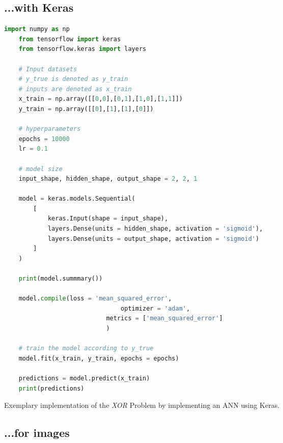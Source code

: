 %
\clearpage


%
%
\subsection{...with Keras}	
%
%

%
%
\vspace{0.5cm}
\begin{algorithm}
	\begin{lstlisting}[language=Python]
	import numpy as np
	from tensorflow import keras
	from tensorflow.keras import layers

	# Input datasets
	# y_true is denoted as y_train 
	# inputs are denoted as x_train
	x_train = np.array([[0,0],[0,1],[1,0],[1,1]])
	y_train = np.array([[0],[1],[1],[0]])

	# hyperparameters
	epochs = 10000
	lr = 0.1

	# model size
	input_shape, hidden_shape, output_shape = 2, 2, 1

	model = keras.models.Sequential(
		[
			keras.Input(shape = input_shape),
			layers.Dense(units = hidden_shape, activation = 'sigmoid'),
			layers.Dense(units = output_shape, activation = 'sigmoid')
		]
	)

	print(model.summmary())

	model.compile(loss = 'mean_squared_error', 
								optimizer = 'adam',
				  			metrics = ['mean_squared_error']
				  			)

	# train the model according to y_true
	model.fit(x_train, y_train, epochs = epochs)

	predictions = model.predict(x_train)
	print(predictions)
\end{lstlisting}
\caption[Keras implementation of the \textit{XOR} Problem]{Exemplary implementation of the \textit{XOR} Problem by implementing an ANN using Keras.}
\label{alg:xor_ann_keras}	
\end{algorithm}
\vspace{0.5cm}
%
\vspace{2em}
%

%
%
\subsection{...for images}	
%
%

